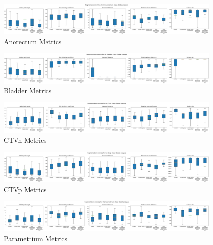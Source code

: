 \documentclass[11pt,twoside]{report}
\begin{document}
\begin{landscape}

  \begin{figure}[H]
    \centering
    \includegraphics[width=\linewidth]{../../research/source/code/data/metrics/metricsanorectum_1_combinednotable_Global_analysis.png}
    \caption{Anorectum Metrics}\label{fig:region-based-metrics-anorectum}
  \end{figure}

  \begin{figure}[H]
    \centering
    \includegraphics[width=\linewidth]{../../research/source/code/data/metrics/metricsbladder_1_combinednotable_Global_analysis.png}
    \caption{Bladder Metrics}\label{fig:region-based-metrics-bladder}
  \end{figure}

  \begin{figure}[H]
    \centering
    \includegraphics[width=\linewidth]{../../research/source/code/data/metrics/metricsctvn_1_combinednotable_Global_analysis.png}
    \caption{CTVn Metrics}\label{fig:region-based-metrics-ctvn}
  \end{figure}

  \begin{figure}[H]
    \centering
    \includegraphics[width=\linewidth]{../../research/source/code/data/metrics/metricsctvp_1_combinednotable_Global_analysis.png}
    \caption{CTVp Metrics}\label{fig:region-based-metrics-ctvp}
  \end{figure}

  \begin{figure}[H]
    \centering
    \includegraphics[width=\linewidth]{../../research/source/code/data/metrics/metricsparametrium_1_combinednotable_Global_analysis.png}
    \caption{Parametrium Metrics}\label{fig:region-based-metrics-parametrium}
  \end{figure}


\end{landscape}
\end{document}
